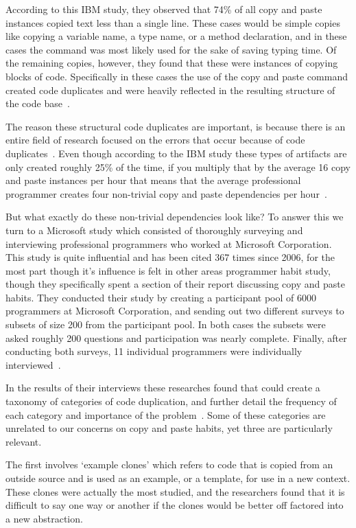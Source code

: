 \documentclass{acm_proc_article-sp}
\begin{document}
According to this IBM study, they observed that 74\% of all copy and paste instances copied text less than a single line. These cases would be simple copies like copying a variable name, a type name, or a method declaration, and in these cases the command was most likely used for the sake of saving typing time. Of the remaining copies, however, they found that these were instances of copying blocks of code. Specifically in these cases the use of the copy and paste command created code duplicates and were heavily reflected in the resulting structure of the code base~\cite{ooplCP}.

The reason these structural code duplicates are important, is because there is an entire field of research focused on the errors that occur because of code duplicates~\cite{devWorkHabits}. Even though according to the IBM study these types of artifacts are only created roughly 25\% of the time, if you multiply that by the average 16 copy and paste instances per hour that means that the average professional programmer creates four non-trivial copy and paste dependencies per hour~\cite{ooplCP}. 

But what exactly do these non-trivial dependencies look like? To answer this we turn to a Microsoft study which consisted of thoroughly surveying and interviewing professional programmers who worked at Microsoft Corporation. This study is quite influential and has been cited 367 times since 2006, for the most part though it's influence is felt in other areas programmer habit study, though they specifically spent a section of their report discussing copy and paste habits. They conducted their study by creating a participant pool of 6000 programmers at Microsoft Corporation, and sending out two different surveys to subsets of size 200 from the participant pool. In both cases the subsets were asked roughly 200 questions and participation was nearly complete. Finally, after conducting both surveys, 11 individual programmers were individually interviewed~\cite{devWorkHabits}. 

In the results of their interviews these researches found that could create a taxonomy of categories of code duplication, and further detail the frequency of each category and importance of the problem~\cite{devWorkHabits}. Some of these categories are unrelated to our concerns on copy and paste habits, yet three are particularly relevant.

The first involves `example clones' which refers to code that is copied from an outside source and is used as an example, or a template, for use in a new context. These clones were actually the most studied, and the researchers found that it is difficult to say one way or another if the clones would be better off factored into a new abstraction. 
\end{document}
